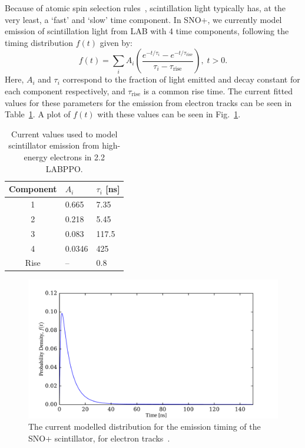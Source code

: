 Because of atomic spin selection rules~\cite{}, %
scintillation light typically has, at the very least, a `fast' and `slow' time component. In SNO+, we currently model emission of scintillation light from LAB with 4 time components, following the timing distribution $f(t)$ given by:
\begin{equation}
    f(t) = \sum_{i}A_{i}\left(\frac{e^{-t/\tau_{i}}-e^{-t/\tau_{\mathrm{rise}}}}{\tau_{i}-\tau_\mathrm{rise}}\right),\; t > 0.
\end{equation}
Here, $A_{i}$ and $\tau_{i}$ correspond to the fraction of light emitted and decay constant for each component respectively, and $\tau_\mathrm{rise}$ is a common rise time. The current fitted values for these parameters for the emission from electron tracks can be seen in Table~\ref{tab:scint_reem_params}. A plot of $f(t)$ with these values can be seen in Fig.~\ref{fig:typical_tres_dist_physics}.

\begin{table}
    \centering
    \begin{tabular}{c p{2cm} p{2cm}}
        \hline
        Component & $A_{i}$ & $\tau_{i}$ [ns] \\ \hline \hline
        1         & 0.665   & 7.35  \\
        2         & 0.218   & 5.45  \\
        3         & 0.083   & 117.5 \\
        4         & 0.0346  & 425   \\
        Rise      & --      & 0.8   \\
        \hline
    \end{tabular}
    \caption{Current values used to model scintillator emission from high-energy electrons in \SI{2.2}{\gpl} LABPPO.}
    \label{tab:scint_reem_params}
\end{table}

\begin{figure}
    \centering
    \includegraphics[width=\linewidth]{2_Detector/Figs/scintillator_emission_timing_profile_LABPPO22gl.pdf}
    \caption[The current modelled distribution for the emission timing of the SNO+ scintillator]{The current modelled distribution for the emission timing of the SNO+ scintillator, for electron tracks~\cite{}.%
    }
    \label{fig:typical_tres_dist_physics}
\end{figure}

